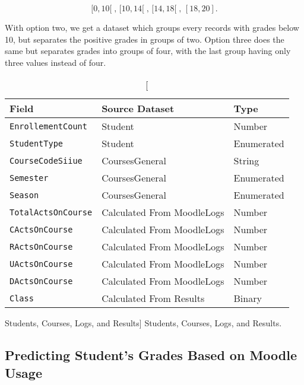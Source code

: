 \[
    [0, 10[\;,\, [10, 14[\;,\, [14, 18[\;,\, [18, 20].
\]

With option two, we get a dataset which groups every records with grades below
10, but separates the positive grades in groups of two. Option three does the
same but separates grades into groups of four, with the last group having only
three values instead of four.

\begin{table}[h!]
    \centering

    \begin{tabular}{| l | l | l |}
        \hline
        \textbf{Field}             & \textbf{Source Dataset}    & \textbf{Type} \\ \hline
        \texttt{EnrollementCount}  & Student                    & Number        \\ \hline
        \texttt{StudentType}       & Student                    & Enumerated    \\ \hline
        \texttt{CourseCodeSiiue}   & CoursesGeneral             & String        \\ \hline
        \texttt{Semester}          & CoursesGeneral             & Enumerated    \\ \hline
        \texttt{Season}            & CoursesGeneral             & Enumerated    \\ \hline
        \texttt{TotalActsOnCourse} & Calculated From MoodleLogs & Number        \\ \hline
        \texttt{CActsOnCourse}     & Calculated From MoodleLogs & Number        \\ \hline
        \texttt{RActsOnCourse}     & Calculated From MoodleLogs & Number        \\ \hline
        \texttt{UActsOnCourse}     & Calculated From MoodleLogs & Number        \\ \hline
        \texttt{DActsOnCourse}     & Calculated From MoodleLogs & Number        \\ \hline
        \texttt{Class}             & Calculated From Results    & Binary        \\ \hline
    \end{tabular}

    \caption
        [Students, Courses, Logs, and Results]
        {Students, Courses, Logs, and Results.}

    \label{tab:dat_001}
\end{table}

\subsection{Predicting Student's Grades Based on Moodle Usage}
\label{sec:exp_001}


